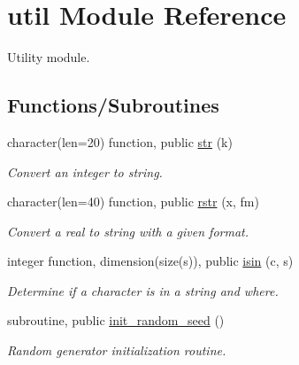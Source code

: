 \hypertarget{namespaceutil}{}\section{util Module Reference}
\label{namespaceutil}


Utility module.  


\subsection*{Functions/\+Subroutines}
\begin{DoxyCompactItemize}
\item 
\mbox{\label{namespaceutil_a1df36d0696c9183ceb6bb770f1d88111}} 
character(len=20) function, public \hyperlink{namespaceutil_a1df36d0696c9183ceb6bb770f1d88111}{str} (k)
\begin{DoxyCompactList}\small\item\em Convert an integer to string. \end{DoxyCompactList}\item 
\mbox{\label{namespaceutil_ac1630658a46867b1f7255eaa51198bf3}} 
character(len=40) function, public \hyperlink{namespaceutil_ac1630658a46867b1f7255eaa51198bf3}{rstr} (x, fm)
\begin{DoxyCompactList}\small\item\em Convert a real to string with a given format. \end{DoxyCompactList}\item 
integer function, dimension(size(s)), public \hyperlink{namespaceutil_a1e2cd46baa2070e28949e28c8a3e037e}{isin} (c, s)
\begin{DoxyCompactList}\small\item\em Determine if a character is in a string and where. \end{DoxyCompactList}\item 
\mbox{\label{namespaceutil_a3c2dcf05b068a55f0066d2b393e75dc7}} 
subroutine, public \hyperlink{namespaceutil_a3c2dcf05b068a55f0066d2b393e75dc7}{init\+\_\+random\+\_\+seed} ()
\begin{DoxyCompactList}\small\item\em Random generator initialization routine. \end{DoxyCompactList}\item 
\mbox{\label{namespaceutil_af8d0a8ec8cb7391ddbf455dc92f2189d}} 

\end{DoxyCompactItemize}
